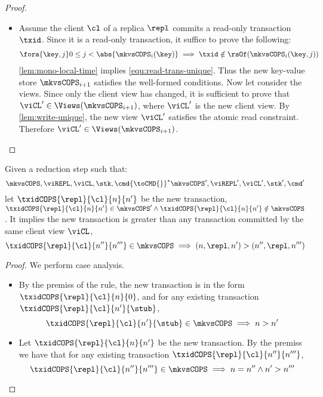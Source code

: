 \begin{proof}
\begin{itemize}
\begin{itemize}
            \item {}
                Assume the client \( \cl \) of a replica \( \repl \) commits a read-only transaction \( \txid \).
                Since it is a read-only transaction, it suffice to prove the following:
                \begin{gather}
                    \fora{\key,j} 0 \leq j < \abs{ \mkvsCOPS_i(\key) } \implies \txid \notin \rsOf(\mkvsCOPS_{i}(\key, j)) \label{equ:read-trans-unique} 
                \end{gather}
                \cref{lem:mono-local-time} implies \cref{equ:read-trans-unique}.
                Thus the new key-value store \( \mkvsCOPS_{i+1} \) satisfies the well-formed conditions.
                Now let consider the views.
                Since only the client view has changed, it is sufficient to  prove that \( \viCL' \in \Views(\mkvsCOPS_{i+1}) \), 
                where \( \viCL' \) is the new client view.
                By \cref{lem:write-unique}, the new view \( \viCL' \) satisfies the atomic read constraint.
                Therefore \( \viCL' \in \Views(\mkvsCOPS_{i+1})  \).
        \end{itemize}
    \end{itemize}
\end{proof}



\begin{lemma}
    \label{lem:mono-local-time}
    Given a reduction step such that: 
    \[
        \mkvsCOPS, \viREPL, \viCL, \stk, \cmd {\toCMD{}}^* \mkvsCOPS', \viREPL', \viCL', \stk', \cmd'
    \]
    let \( \txidCOPS{\repl}{\cl}{n}{n'} \) be the new transaction, \ie \( \txidCOPS{\repl}{\cl}{n}{n'} \in \mkvsCOPS' \land  \txidCOPS{\repl}{\cl}{n}{n'} \notin \mkvsCOPS \).
    It implies the new transaction is greater than any transaction committed by the same client view \( \viCL \), \ie
    \[ 
        \txidCOPS{\repl}{\cl}{n''}{n'''} \in \mkvsCOPS \implies (n,\repl,n') > (n'', \repl, n''')
    \]
\end{lemma}
\begin{proof}
    We perform case analysis.
    \begin{itemize}
        \item {}
            By the premiss of the rule, 
            the new transaction is in the form \( \txidCOPS{\repl}{\cl}{n}{0} \),
            and for any existing transaction \( \txidCOPS{\repl}{\cl}{n'}{\stub} \),
            \[
                \txidCOPS{\repl}{\cl}{n'}{\stub} \in \mkvsCOPS \implies n > n'
            \]
        \item {}
            Let \( \txidCOPS{\repl}{\cl}{n}{n'} \) be the new transaction.
            By the premiss we have that for any existing transaction \( \txidCOPS{\repl}{\cl}{n''}{n'''} \), 
            \[
                \txidCOPS{\repl}{\cl}{n''}{n'''} \in \mkvsCOPS \implies n = n'' \land n' > n'''
            \]
    \end{itemize}
\end{proof}

